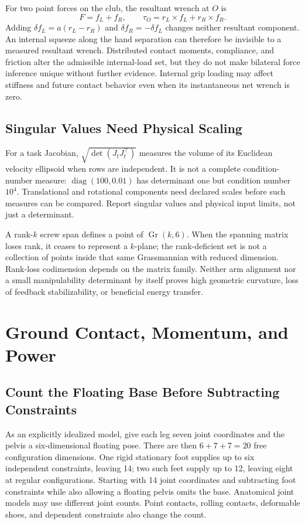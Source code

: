 For two point forces on the club, the resultant wrench at $O$ is
\begin{equation}
 F=f_L+f_R,\qquad \tau_O=r_L\times f_L+r_R\times f_R.
\end{equation}
Adding $\delta f_L=a(r_L-r_R)$ and $\delta f_R=-\delta f_L$ changes neither resultant component. An internal squeeze along the hand separation can therefore be invisible to a measured resultant wrench. Distributed contact moments, compliance, and friction alter the admissible internal-load set, but they do not make bilateral force inference unique without further evidence. Internal grip loading may affect stiffness and future contact behavior even when its instantaneous net wrench is zero.

\subsection{Singular Values Need Physical Scaling}

For a task Jacobian, $\sqrt{\det(J_tJ_t^\top)}$ measures the volume of its Euclidean velocity ellipsoid when rows are independent. It is not a complete condition-number measure: $\operatorname{diag}(100,0.01)$ has determinant one but condition number $10^4$. Translational and rotational components need declared scales before such measures can be compared. Report singular values and physical input limits, not just a determinant.

A rank-$k$ screw span defines a point of $\operatorname{Gr}(k,6)$. When the spanning matrix loses rank, it ceases to represent a $k$-plane; the rank-deficient set is not a collection of points inside that same Grassmannian with reduced dimension. Rank-loss codimension depends on the matrix family. Neither arm alignment nor a small manipulability determinant by itself proves high geometric curvature, loss of feedback stabilizability, or beneficial energy transfer.

\section{Ground Contact, Momentum, and Power}
\label{sec:ch9:grf}

\subsection{Count the Floating Base Before Subtracting Constraints}

As an explicitly idealized model, give each leg seven joint coordinates and the pelvis a six-dimensional floating pose. There are then $6+7+7=20$ free configuration dimensions. One rigid stationary foot supplies up to six independent constraints, leaving 14; two such feet supply up to 12, leaving eight at regular configurations. Starting with 14 joint coordinates and subtracting foot constraints while also allowing a floating pelvis omits the base. Anatomical joint models may use different joint counts. Point contacts, rolling contacts, deformable shoes, and dependent constraints also change the count.

